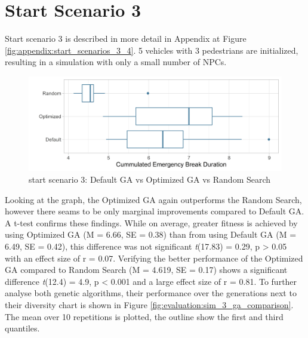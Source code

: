 \section{Start Scenario 3}
\label{sect:evaluation:scenario_3}
Start scenario 3 is described in more detail in Appendix at Figure \ref{fig:appendix:start_scenarios_3_4}. 5 vehicles with 3 pedestrians are initialized, resulting in a simulation with only a small number of NPCs.

\begin{figure}[ht] 
	\includegraphics[width=1\linewidth]{simulations/evaluation/plots/sim_3_comparison}
	\caption{start scenario 3: Default GA vs Optimized GA vs Random Search}
	\label{fig:evaluation:sim_3_comparison}
\end{figure}

Looking at the graph, the Optimized GA again outperforms the Random Search, however there seams to be only marginal improvements compared to Default GA.  A t-test confirms these findings. While on average, greater fitness is achieved by using Optimized GA (M = 6.66, SE = 0.38) than from using Default GA (M = 6.49, SE = 0.42), this difference was not significant \textit{t}(17.83) = 0.29, p > 0.05 with an effect size of r = 0.07. Verifying the better performance of the Optimized GA compared to Random Search (M = 4.619, SE = 0.17) shows a significant difference \textit{t}(12.4) = 4.9, p < 0.001 and a large effect size of r = 0.81. To further analyse both genetic algorithms, their performance over the generations next to their diversity chart is shown in Figure \ref{fig:evaluation:sim_3_ga_comparison}. The mean over 10 repetitions is plotted, the outline show the first and third quantiles.

